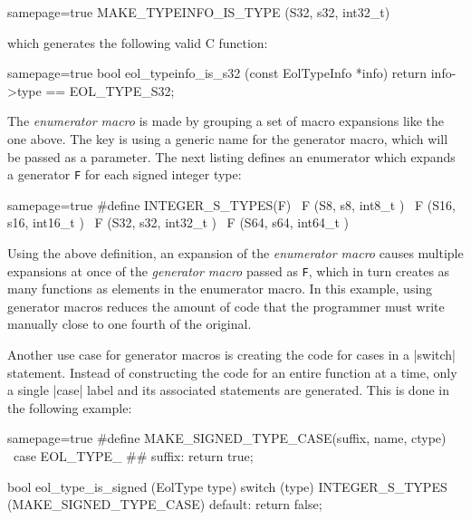 \begin{ccode*}{samepage=true}
MAKE_TYPEINFO_IS_TYPE (S32, s32, int32_t)
\end{ccode*}

\noindent
which generates the following valid C function:

\begin{ccode*}{samepage=true}
  bool eol_typeinfo_is_s32 (const EolTypeInfo *info)
  { return info->type == EOL_TYPE_S32; }
\end{ccode*}

\noindent The \emph{enumerator macro} is made by grouping a set of macro
expansions like the one above. The key is using a generic name for the
generator macro, which will be passed as a parameter. The next listing defines
an enumerator which expands a generator \verb|F| for each signed integer type:

\begin{ccode*}{samepage=true}
#define INTEGER_S_TYPES(F) \
    F (S8,  s8,  int8_t  ) \
    F (S16, s16, int16_t ) \
    F (S32, s32, int32_t ) \
    F (S64, s64, int64_t )
\end{ccode*}

\noindent Using the above definition, an expansion of the \emph{enumerator
macro} causes multiple expansions at once of the \emph{generator macro} passed
as \verb|F|, which in turn creates as many functions as elements in the
enumerator macro. In this example, using generator macros reduces the amount
of code that the programmer must write manually close to one fourth of the
original.

Another use case for generator macros is creating the code for cases in
a \Mc|switch| statement. Instead of constructing the code for an entire
function at a time, only a single \Mc|case| label and its associated
statements are generated. This is done in the following example:

\begin{ccode*}{samepage=true}
#define MAKE_SIGNED_TYPE_CASE(suffix, name, ctype) \
    case EOL_TYPE_ ## suffix: return true;

bool eol_type_is_signed (EolType type) {
  switch (type) {
    INTEGER_S_TYPES (MAKE_SIGNED_TYPE_CASE)
    default: return false;
  }
}
\end{ccode*}

